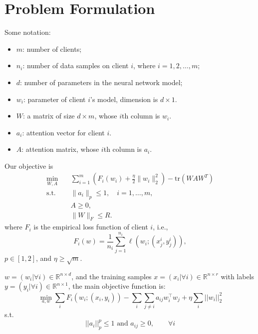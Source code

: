 {\section{Problem Formulation}
Some notation:
\begin{itemize}
    \item $m$: number of clients;
    \item $n_i$: number of data samples on client $i$, where $i=1,2,\dots,m$;
    \item $d$: number of parameters in the neural network model;
    \item $w_i$: parameter of client $i$'s model, dimension is $d\times 1$.
    \item $W$: a matrix of size $d\times m$, whose $i$th column is $w_i$.
    \item $a_i$: attention vector for client $i$.
    \item $A$: attention matrix, whose $i$th column is $a_i$.
\end{itemize}
Our objective is
\begin{equation}
    \label{eq:main-obj}
    \begin{aligned}
    \min_{W,A} & \quad \sum_{i=1}^m \left(F_i(w_i) + \frac{\eta}{2}\|w_i\|_2^2\right) - \mbox{tr}(WAW^T) \\
    \mbox{s.t.} & \quad \|a_i\|_p \leq 1, \quad i=1,\dots,m, \\
    & \quad A \geq 0, \\
    & \quad \|W\|_F \leq R.
    \end{aligned}
\end{equation}
where $F_i$ is the empirical loss function of client $i$, i.e., 
\begin{equation}
    \label{eq:elm-i}
    F_i(w) = \frac{1}{n_i}\sum_{j=1}^{n_i} \ell(w_i;(x_j^i,y_j^i)),
\end{equation}
$p\in[1,2]$, and $\eta \geq \sqrt{m}$.

$w = (w_{i}| \forall i) \in \mathbb{R}^{n \times d}$, and the training samples $x =(x_{i}| \forall i) \in \mathbb{R}^{n \times r}$ with labels $y =(y_{i}| \forall i) \in \mathbb{R}^{n \times 1}$, the main objective function is:
\begin{equation}
    \min_{a, w} \sum_{i} F_i(w_i; (x_i, y_i)) - \sum_{i}\sum_{j \neq i} a_{ij}w_{i}^{\top}w_{j} + \eta \sum_{i}||w_{i}||_{2}^{2}
\end{equation}
s.t.
\begin{equation}
\label{equation_constraint-p-norm}
    ||a_{i}||_{p}^{p} \leq 1 \text{ and } a_{ij} \geq 0,  \quad \quad \forall i
\end{equation}

}
